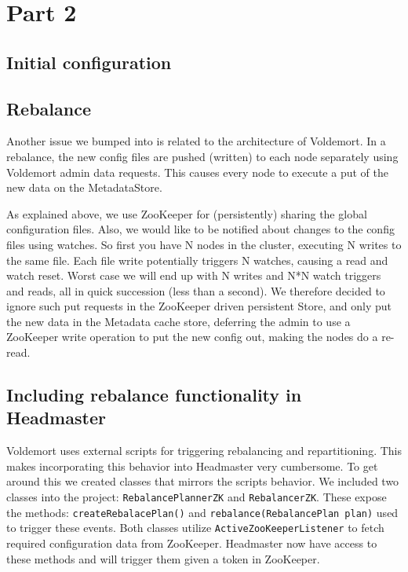 \section{Part 2}

\subsection{Initial configuration}


\subsection{Rebalance}
Another issue we bumped into is related to the architecture of Voldemort.
In a rebalance, the new config files are pushed (written) to each node separately using Voldemort admin data requests. This causes every node to execute a put of the new data on the MetadataStore.

As explained above, we use ZooKeeper for (persistently) sharing the global configuration files.
Also, we would like to be notified about changes to the config files using watches. So first you have N nodes in the cluster, executing N writes to the same file. Each file write potentially triggers N watches, causing a read and watch reset. Worst case we will end up with N writes and N*N watch triggers and reads, all in quick succession (less than a second).
We therefore decided to ignore such put requests in the ZooKeeper driven persistent Store, and only put the new data in the Metadata cache store, deferring the admin to use a ZooKeeper write operation to put the new config out, making the nodes do a re-read.


\subsection{Including rebalance functionality in Headmaster}
Voldemort uses external scripts for triggering rebalancing and repartitioning. This makes incorporating this behavior into Headmaster very cumbersome. To get around this we created classes that mirrors the scripts behavior. We included two classes into the project: \texttt{RebalancePlannerZK} and \texttt{RebalancerZK}. These expose the methods: \texttt{createRebalacePlan()} and \texttt{rebalance(RebalancePlan plan)} used to trigger these events. Both classes utilize \texttt{ActiveZooKeeperListener} to fetch required configuration data from ZooKeeper. Headmaster now have access to these methods and will trigger them given a token in ZooKeeper. 



